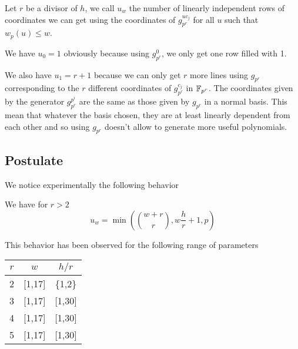 \documentclass[a4paper]{article}
\begin{document}


Let $r$ be a divisor of $h$, we call $u_w$ the number of linearly independent rows of coordinates we can get using the coordinates of $g_{p^r}^{uc_j}$ for all $u$ such that $w_p(u) \leq w$.

We have $u_0 = 1$ obviously because using $g_{p^r}^0$, we only get one row filled with 1.

We also have $u_1 = r+1$ because we can only get $r$ more lines using $g_{p^r}$ corresponding to the $r$ different coordinates of $g_{p^r}^{c_j}$ in $\mathbb{F}_{p^r}$. The coordinates given by the generator $g_{p^r}^{p^i}$ are the same as those given by $g_{p^r}$ in a normal basis. This mean that whatever the basis chosen, they are at least linearly dependent from each other and so using $g_{p^r}$ doesn't allow to generate more useful polynomials.



\subsection{Postulate}

We notice experimentally the following behavior

\begin{postulate}
\label{postulate}
We have for $r > 2$
$$ u_w = \min \left( \binom{w+r}{r}, w\frac{h}{r} + 1 , p \right)$$
\end{postulate}

This behavior has been observed for the following range of parameters
\begin{center}
\begin{tabular}{|c|c|c|}
\hline
$r$ & $w$ 	& $h/r$ \\
\hline
2	& [1,17]	& \{1,2\}	\\
\hline
3	& [1,17]	& [1,30] \\
\hline
4	& [1,17]	& [1,30] \\
\hline
5	& [1,17]	& [1,30] \\
\hline
\end{tabular}
\end{center}
\end{document}
